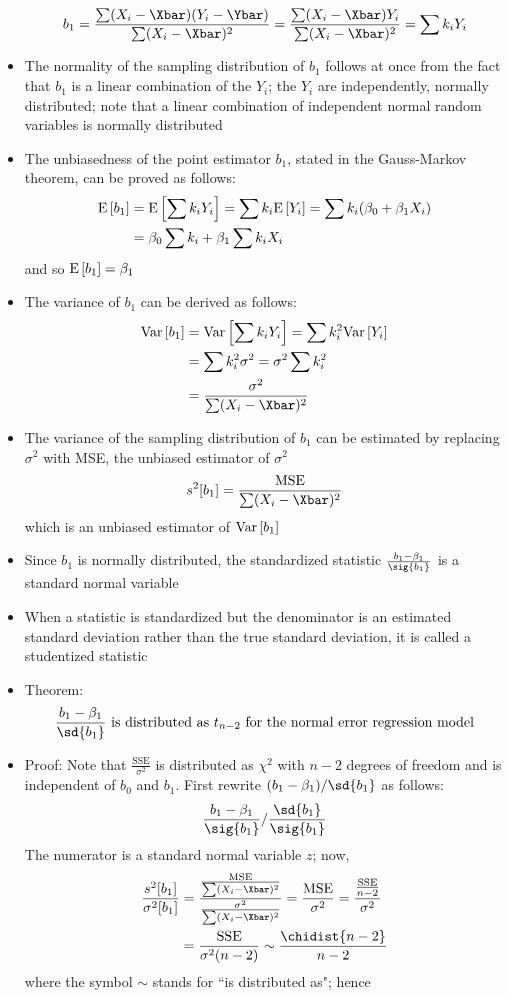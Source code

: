 \begin{itemize}
$$ b_1 = \frac{\sum (X_i - \Xbar)(Y_i - \Ybar)}{\sum (X_i - \Xbar)^2} = \frac{\sum (X_i - \Xbar)Y_i}{\sum (X_i - \Xbar)^2} = \sum k_i Y_i $$ 
\item The normality of the sampling distribution of $b_1$ follows at once from the fact that $b_1$ is a linear combination of the $Y_i$; the $Y_i$ are independently, normally distributed; note that a linear combination of independent normal random variables is normally distributed 
\item The unbiasedness of the point estimator $b_1$, stated in the Gauss-Markov theorem, can be proved as follows: 
$$ \begin{aligned} \mathrm{E}\left[ b_1 \right] &= \mathrm{E}\left[ \sum k_iY_i \right] = \sum k_i \mathrm{E}\left[ Y_i \right] = \sum k_i(\beta_0 + \beta_1X_i) \\ &= \beta_0 \sum k_i + \beta_1 \sum k_iX_i \end{aligned} $$ and so $\mathrm{E}\left[ b_1 \right] = \beta_1$
\item The variance of $b_1$ can be derived as follows: $$ \begin{aligned} 
\var{b_1} &= \var{\sum k_iY_i} = \sum k_i^2 \var{Y_i} \\ &= \sum k_i^2 \sigma^2 = \sigma^2 \sum k_i^2 \\ &= \frac{\sigma^2}{\sum (X_i - \Xbar)^2} \end{aligned} $$ 
\item The variance of the sampling distribution of $b_1$ can be estimated by replacing $\sigma^2$ with MSE, the unbiased estimator of $\sigma^2$
$$ s^2[b_1] = \frac{\text{MSE}}{\sum (X_i - \Xbar)^2} $$ which is an unbiased estimator of $\mathrm{Var}\left[ b_1 \right]$
\item Since $b_1$ is normally distributed, the standardized statistic $\frac{b_1 - \beta_1}{\sig{b_1}}$ is a standard normal variable
\item When a statistic is standardized but the denominator is an estimated standard deviation rather than the true standard deviation, it is called a studentized statistic
\item Theorem: $$ \frac{b_1 - \beta_1}{\sd{b_1}} \text{ is distributed as } t_{n-2} \text{ for the normal error regression model} $$ 
\item Proof: Note that $\frac{\text{SSE}}{\sigma^2}$ is distributed as $\chi^2$ with $n-2$ degrees of freedom and is independent of $b_0$ and $b_1$. First rewrite $(b_1 - \beta_1)/\sd{b_1}$ as follows:
$$ \frac{b_1-\beta_1}{\sig{b_1}} / \frac{\sd{b_1}}{\sig{b_1}} $$ 
The numerator is a standard normal variable $z$; now, $$ \begin{aligned} \frac{s^2[b_1]}{\sigma^2[b_1]} &= \frac{ \frac{\text{MSE}}{\sum (X_i - \Xbar)^2}}{ \frac{\sigma^2}{\sum (X_i - \Xbar)^2}} = \frac{\text{MSE}}{\sigma^2} = \frac{\frac{\text{SSE}}{n-2}}{\sigma^2} \\ &= \frac{ \text{SSE}}{\sigma^2(n-2)} \sim \frac{\chidist{n-2}}{n-2} \end{aligned} $$  where the symbol $\sim$ stands for ``is distributed as"; hence

\end{itemize}
